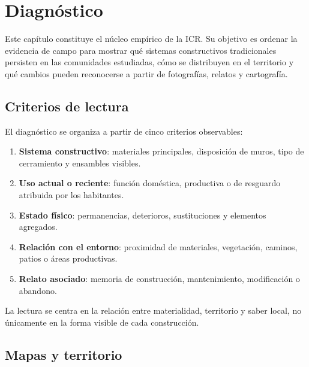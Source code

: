 \section{Diagnóstico}

\graphicspath{{../trabajos/07_figuras_para_icr/planos_qgis/}{../trabajos/07_figuras_para_icr/fotografias_icr_optimizadas/C-01_penca_de_maguey/}{../trabajos/07_figuras_para_icr/fotografias_icr_optimizadas/C-02_piedra_local_tepetate/}{../trabajos/07_figuras_para_icr/fotografias_icr_optimizadas/C-03_bajareque/}{../trabajos/07_figuras_para_icr/fotografias_icr_optimizadas/C-04_organos/}}

Este capítulo constituye el núcleo empírico de la ICR. Su objetivo es ordenar la evidencia de campo para mostrar qué sistemas constructivos tradicionales persisten en las comunidades estudiadas, cómo se distribuyen en el territorio y qué cambios pueden reconocerse a partir de fotografías, relatos y cartografía.

\subsection{Criterios de lectura}

El diagnóstico se organiza a partir de cinco criterios observables:

\begin{enumerate}
	\item \textbf{Sistema constructivo}: materiales principales, disposición de muros, tipo de cerramiento y ensambles visibles.
	\item \textbf{Uso actual o reciente}: función doméstica, productiva o de resguardo atribuida por los habitantes.
	\item \textbf{Estado físico}: permanencias, deterioros, sustituciones y elementos agregados.
	\item \textbf{Relación con el entorno}: proximidad de materiales, vegetación, caminos, patios o áreas productivas.
	\item \textbf{Relato asociado}: memoria de construcción, mantenimiento, modificación o abandono.
\end{enumerate}

La lectura se centra en la relación entre materialidad, territorio y saber local, no únicamente en la forma visible de cada construcción.

\subsection{Mapas y territorio}

